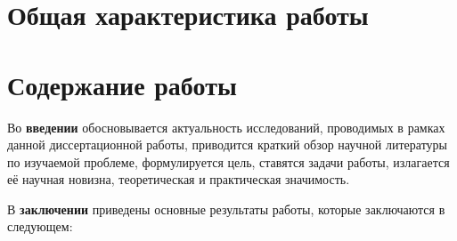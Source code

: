 
\section*{Общая характеристика работы} %



\section*{Содержание работы}
Во \textbf{введении} обосновывается актуальность исследований, проводимых в рамках данной диссертационной работы, приводится краткий обзор научной литературы по изучаемой проблеме, формулируется цель, ставятся задачи работы, излагается её научная новизна, теоретическая и практическая значимость.



В \textbf{заключении} приведены основные результаты работы, которые заключаются в следующем:

